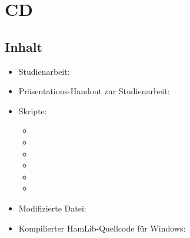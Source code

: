 


\appendix


\renewcommand{\thechapter}{Anhang \Alph{chapter}}


\chapter{CD}
\label{chap:cdappendix}

\section*{Inhalt}

\begin{itemize}
	\parskip0pt
	\item Studienarbeit: 
	\item Präsentations-Handout zur Studienarbeit: 
	\item Skripte:
	\begin{itemize}
		\item {}
		\item {}
		\item {}
		\item {}
		\item {}
		\item {}
	\end{itemize}
	\item Modifizierte Datei: 
	\item Kompilierter HamLib-Quellcode für Windows: 
\end{itemize}

